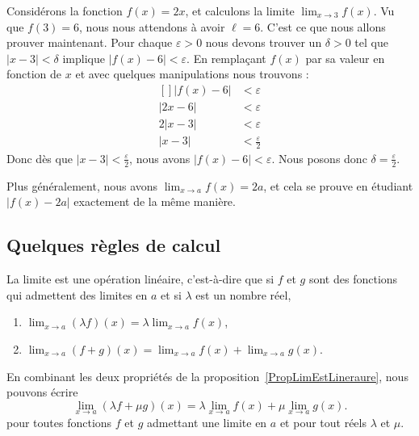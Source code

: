 \begin{example}
	Considérons la fonction $f(x)=2x$, et calculons la limite $\lim_{x\to 3} f(x)$. Vu que $f(3)=6$, nous nous attendons à avoir $\ell=6$. C'est ce que nous allons prouver maintenant. Pour chaque $\varepsilon>0$ nous devons trouver un $\delta>0$ tel que $| x-3 |<\delta$ implique $| f(x)-6 |<\varepsilon$. En remplaçant $f(x)$ par sa valeur en fonction de $x$ et avec quelques manipulations nous trouvons :
	\begin{equation}
		\begin{aligned}[]
			| f(x)-6 |&<\varepsilon\\
			| 2x-6 |&<\varepsilon\\
			2| x-3 |&<\varepsilon\\
			| x-3 |&<\frac{ \varepsilon }{2}
		\end{aligned}
	\end{equation}
	Donc dès que $| x-3 |<\frac{ \varepsilon }{2}$, nous avons $| f(x)-6 |<\varepsilon$. Nous posons donc $\delta=\frac{ \varepsilon }{2}$.

	Plus généralement, nous avons $\lim_{x\to a} f(x)=2a$, et cela se prouve en étudiant $| f(x)-2a |$ exactement de la même manière.
\end{example}

\subsection{Quelques règles de calcul}

\begin{proposition}	\label{PropLimEstLineraure}
	La limite est une opération linéaire, c'est-à-dire que si $f$ et $g$ sont des fonctions qui admettent des limites en $a$ et si $\lambda$ est un nombre réel,
	\begin{enumerate}

		\item
			$\lim_{x\to a} (\lambda f)(x)=\lambda\lim_{x\to a} f(x)$,
		\item
			$\lim_{x\to a} (f+g)(x)=\lim_{x\to a} f(x)+\lim_{x\to a} g(x)$.
	\end{enumerate}
\end{proposition}
En combinant les deux propriétés de la proposition~\ref{PropLimEstLineraure}, nous pouvons écrire
\begin{equation}
	\lim_{x\to a} (\lambda f+\mu g)(x)=\lambda\lim_{x\to a} f(x)+\mu\lim_{x\to a} g(x).
\end{equation}
pour toutes fonctions $f$ et $g$ admettant une limite en $a$ et pour tout réels $\lambda$ et $\mu$.

